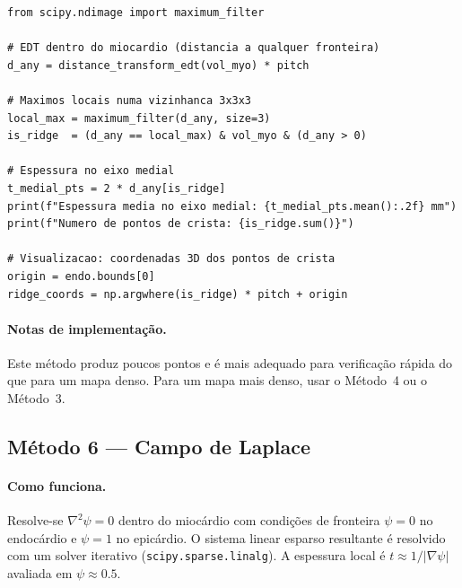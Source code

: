 \begin{lstlisting}
from scipy.ndimage import maximum_filter

# EDT dentro do miocardio (distancia a qualquer fronteira)
d_any = distance_transform_edt(vol_myo) * pitch

# Maximos locais numa vizinhanca 3x3x3
local_max = maximum_filter(d_any, size=3)
is_ridge  = (d_any == local_max) & vol_myo & (d_any > 0)

# Espessura no eixo medial
t_medial_pts = 2 * d_any[is_ridge]
print(f"Espessura media no eixo medial: {t_medial_pts.mean():.2f} mm")
print(f"Numero de pontos de crista: {is_ridge.sum()}")

# Visualizacao: coordenadas 3D dos pontos de crista
origin = endo.bounds[0]
ridge_coords = np.argwhere(is_ridge) * pitch + origin
\end{lstlisting}

\paragraph{Notas de implementação.}
Este método produz poucos pontos e é mais adequado para
verificação rápida do que para um mapa denso. Para um mapa mais
denso, usar o Método~4 ou o Método~3.

\subsection{Método 6 --- Campo de Laplace}
\label{impl:laplace}

\paragraph{Como funciona.}
Resolve-se $\nabla^2\psi = 0$ dentro do miocárdio com condições
de fronteira $\psi=0$ no endocárdio e $\psi=1$ no epicárdio.
O sistema linear esparso resultante é resolvido com um solver
iterativo (\texttt{scipy.sparse.linalg}). A espessura local é
$t \approx 1/|\nabla\psi|$ avaliada em $\psi \approx 0.5$.

